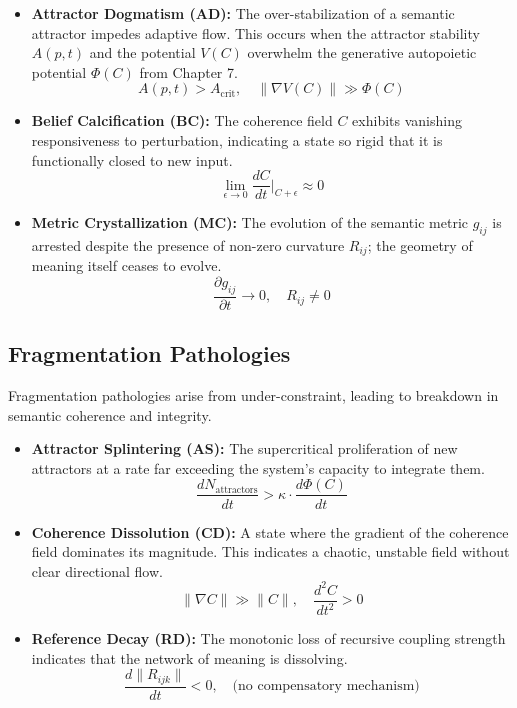 \begin{itemize}
    \item \textbf{Attractor Dogmatism (AD):} The over-stabilization of a semantic attractor impedes adaptive flow. This occurs when the attractor stability \(A(p,t)\) and the potential \(V(C)\) overwhelm the generative autopoietic potential \(\Phi(C)\) from Chapter 7.
    \begin{equation}
    A(p,t) > A_{\text{crit}}, \quad \|\nabla V(C)\| \gg \Phi(C)
    \end{equation}

    \item \textbf{Belief Calcification (BC):} The coherence field \(C\) exhibits vanishing responsiveness to perturbation, indicating a state so rigid that it is functionally closed to new input.
    \begin{equation}
    \lim_{\epsilon \to 0} \frac{dC}{dt}\bigg|_{C+\epsilon} \approx 0
    \end{equation}

    \item \textbf{Metric Crystallization (MC):} The evolution of the semantic metric \(g_{ij}\) is arrested despite the presence of non-zero curvature \(R_{ij}\); the geometry of meaning itself ceases to evolve.
    \begin{equation}
    \frac{\partial g_{ij}}{\partial t} \to 0, \quad R_{ij} \neq 0
    \end{equation}
\end{itemize}

\subsection{Fragmentation Pathologies}

Fragmentation pathologies arise from under-constraint, leading to breakdown in semantic coherence and integrity.

\begin{itemize}
    \item \textbf{Attractor Splintering (AS):} The supercritical proliferation of new attractors at a rate far exceeding the system's capacity to integrate them.
    \begin{equation}
    \frac{dN_{\text{attractors}}}{dt} > \kappa \cdot \frac{d\Phi(C)}{dt}
    \end{equation}

    \item \textbf{Coherence Dissolution (CD):} A state where the gradient of the coherence field dominates its magnitude. This indicates a chaotic, unstable field without clear directional flow.
    \begin{equation}
    \|\nabla C\| \gg \|C\|, \quad \frac{d^2C}{dt^2} > 0
    \end{equation}

    \item \textbf{Reference Decay (RD):} The monotonic loss of recursive coupling strength indicates that the network of meaning is dissolving.
    \begin{equation}
    \frac{d\|R_{ijk}\|}{dt} < 0, \quad \text{(no compensatory mechanism)}
    \end{equation}
\end{itemize}

